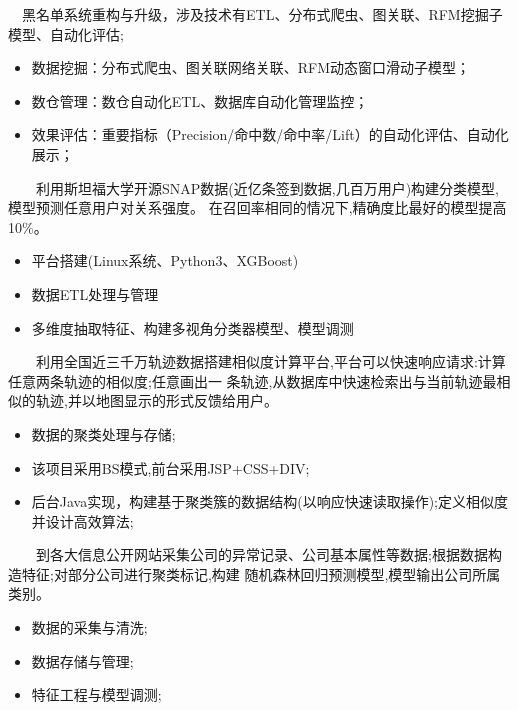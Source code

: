 \documentclass{resume}
\begin{document}
{\ \ 黑名单系统重构与升级，涉及技术有ETL、分布式爬虫、图关联、RFM挖掘子模型、自动化评估;}
\begin{itemize}
  \item 数据挖掘：分布式爬虫、图关联网络关联、RFM动态窗口滑动子模型；
  \item 数仓管理：数仓自动化ETL、数据库自动化管理监控；
  \item 效果评估：重要指标（Precision/命中数/命中率/Lift）的自动化评估、自动化展示；
\end{itemize}
\medskip


{\ \ \ \ 利用斯坦福大学开源SNAP数据(近亿条签到数据,几百万用户)构建分类模型,模型预测任意用户对关系强度。
在召回率相同的情况下,精确度比最好的模型提高10\%。}
\begin{itemize}
  \item 平台搭建(Linux系统、Python3、XGBoost)
  \item 数据ETL处理与管理
  \item 多维度抽取特征、构建多视角分类器模型、模型调测
\end{itemize}
\medskip


{\ \ \ \ 利用全国近三千万轨迹数据搭建相似度计算平台,平台可以快速响应请求:计算任意两条轨迹的相似度;任意画出一
条轨迹,从数据库中快速检索出与当前轨迹最相似的轨迹,并以地图显示的形式反馈给用户。}
\begin{itemize}
  \item 数据的聚类处理与存储;
  \item 该项目采用BS模式,前台采用JSP+CSS+DIV;
  \item 后台Java实现，构建基于聚类簇的数据结构(以响应快速读取操作);定义相似度并设计高效算法;
\end{itemize}
\medskip


{\ \ \ \ 到各大信息公开网站采集公司的异常记录、公司基本属性等数据;根据数据构造特征;对部分公司进行聚类标记,构建
随机森林回归预测模型,模型输出公司所属类别。}
\begin{itemize}
  \item 数据的采集与清洗;
  \item 数据存储与管理;
  \item 特征工程与模型调测;
\end{itemize}
\medskip
\end{document}
